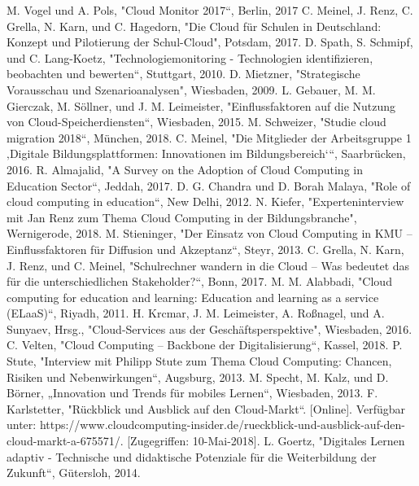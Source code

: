 \documentclass[conference]{IEEEtran}
\begin{document}
\begin{thebibliography}{00}
M. Vogel und A. Pols, "Cloud Monitor 2017“, Berlin, 2017
 C. Meinel, J. Renz, C. Grella, N. Karn, und C. Hagedorn, "Die Cloud für Schulen in Deutschland: Konzept und Pilotierung der Schul-Cloud", Potsdam, 2017.
D. Spath, S. Schmipf, und C. Lang-Koetz, "Technologiemonitoring - Technologien identifizieren, beobachten und bewerten“, Stuttgart, 2010.
 D. Mietzner, "Strategische Vorausschau und Szenarioanalysen", Wiesbaden, 2009.
 L. Gebauer, M. M. Gierczak, M. Söllner, und J. M. Leimeister, "Einflussfaktoren auf die Nutzung von Cloud-Speicherdiensten“, Wiesbaden, 2015.
 M. Schweizer, "Studie cloud migration 2018“, München, 2018.
 C. Meinel, "Die Mitglieder der Arbeitsgruppe 1 ‚Digitale Bildungsplattformen: Innovationen im Bildungsbereich‘“, Saarbrücken, 2016.
 R. Almajalid, "A Survey on the Adoption of Cloud Computing in Education Sector“, Jeddah, 2017.
 D. G. Chandra und D. Borah Malaya, "Role of cloud computing in education“, New Delhi, 2012.
 N. Kiefer, "Experteninterview mit Jan Renz zum Thema Cloud Computing in der Bildungsbranche", Wernigerode, 2018.
 M. Stieninger, "Der Einsatz von Cloud Computing in KMU – Einflussfaktoren für Diffusion und Akzeptanz“, Steyr, 2013.
 C. Grella, N. Karn, J. Renz, und C. Meinel, "Schulrechner wandern in die Cloud – Was bedeutet das für die unterschiedlichen Stakeholder?“, Bonn, 2017.
 M. M. Alabbadi, "Cloud computing for education and learning: Education and learning as a service (ELaaS)“, Riyadh, 2011.
 H. Krcmar, J. M. Leimeister, A. Roßnagel, und A. Sunyaev, Hrsg., "Cloud-Services aus der Geschäftsperspektive", Wiesbaden, 2016.
 C. Velten, "Cloud Computing – Backbone der Digitalisierung“, Kassel, 2018.
 P. Stute, "Interview mit Philipp Stute zum Thema Cloud Computing: Chancen, Risiken und Nebenwirkungen“, Augsburg, 2013.
 M. Specht, M. Kalz, und D. Börner, „Innovation und Trends für mobiles Lernen“, Wiesbaden, 2013.
 F. Karlstetter, "Rückblick und Ausblick auf den Cloud-Markt“. [Online]. Verfügbar unter: https://www.cloudcomputing-insider.de/rueckblick-und-ausblick-auf-den-cloud-markt-a-675571/. [Zugegriffen: 10-Mai-2018].
 L. Goertz, "Digitales Lernen adaptiv - Technische und didaktische Potenziale für die Weiterbildung der Zukunft“, Gütersloh, 2014.

\end{thebibliography}
\end{document}
